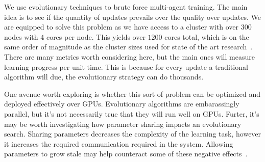 We use evolutionary techniques to brute force multi-agent training.
The main idea is to see if the quantity of updates prevails over the quality over updates.
We are equipped to solve this problem as we have access to a cluster with over $300$ nodes with $4$ cores per node.
This yields over $1200$ cores total, which is on the same order of magnitude as the cluster sizes used for state of the art research~\cite{salimans2017evolution}.
There are many metrics worth considering here, but the main ones will measure learning progress per unit time.
This is because for every update a traditional algorithm will due, the evolutionary strategy can do thousands.

One avenue worth exploring is whether this sort of problem can be optimized and deployed effectively over GPUs.
Evolutionary algorithms are embarassingly parallel, but it's not necessarily true that they will run well on GPUs.
Furter, it’s may be worth investigating how parameter sharing impacts an evolutionary search.
Sharing parameters decreases the complexity of the learning task, however it increases the required communication required in the system.
Allowing parameters to grow stale may help counteract some of these negative effects~\cite{cui2014exploiting}.
